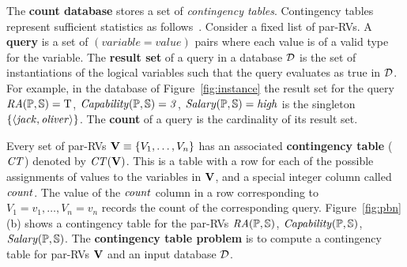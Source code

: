 The \textbf{count database} \CDB stores a set of  {\em contingency tables}. Contingency tables represent sufficient statistics as follows~\cite{Moore1998}. 
Consider a fixed list of par-RVs.
A \textbf{query} is a set of $(variable = value)$ pairs where each value is of a valid type for the variable. 
The \textbf{result set} of a query in a database $\D$ is the set of instantiations of the logical variables such that the query evaluates as true in $\D$.
For example, in the database of Figure~\ref{fig:instance} the result set for the query 
$\it{RA}(\P,\S) = \true$, $\it{Capability}(\P,\S) = 3$, $\it{Salary}(\P,\S) = \it{high} $ is
the singleton $\{\langle \it{jack}, \it{oliver}\rangle\}$. 
The \textbf{count} of a query is the cardinality of its result set. 

Every set of par-RVs $\set{V} \equiv \{\V_{1},\ldots,\V_{n} \}$ has an associated \textbf{contingency table} ($\cttable$) denoted by $\cttable(\set{V})$. %
This is a table with a row for each of the possible assignments of values to the variables in $\set{V}$, and a special integer column called $\qcount$. 
The value of the $\qcount$ column in a row 
corresponding to $V_{1} = v_{1},\ldots,V_{n} = v_{n}$ records the count of the 
corresponding query. 
Figure~\ref{fig:pbn}(b) shows a contingency table for the par-RVs $\it{RA}(\P,\S)$, $\it{Capability}(\P,\S)$, $\it{Salary}(\P,\S)$. The \textbf{contingency table problem} is to compute a contingency table for par-RVs $\set{V} $ and an input database $\D$. 
 


